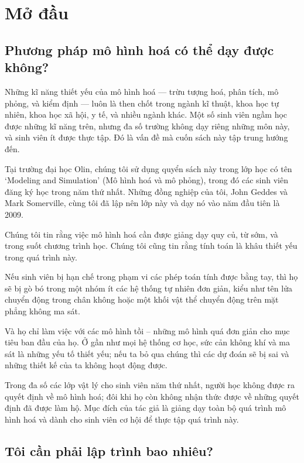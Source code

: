 \documentclass[12pt, openany]{book}
\theoremstyle{exercise}
\begin{document}
\fi

\chapter{Mở đầu}
\label{preface}


\section{Phương pháp mô hình hoá có thể dạy được không?}

Những kĩ năng thiết yếu của mô hình hoá --- trừu tượng hoá, phân tích, mô phỏng, và kiểm định --- luôn là then chốt trong ngành kĩ thuật, khoa học tự nhiên, khoa học xã hội, y tế, và nhiều ngành khác. Một số sinh viên ngầm học được những kĩ năng trên, nhưng đa số trường không dạy riêng những môn này, và sinh viên ít được thực tập. Đó là vấn đề mà cuốn sách này tập trung hướng đến.

Tại trường đại học Olin, chúng tôi sử dụng quyển sách này trong lớp học có tên `Modeling and Simulation' (Mô hình hoá và mô phỏng), trong đó các sinh viên đăng ký học trong năm thứ nhất. Những đồng nghiệp của tôi, John Geddes và Mark Somerville, cùng tôi đã lập nên lớp này và dạy nó vào năm đầu tiên là 2009.

Chúng tôi tin rằng việc mô hình hoá cần được giảng dạy quy củ, từ sớm, và trong suốt chương trình học. Chúng tôi cũng tin rằng tính toán là khâu thiết yếu trong quá trình này. 

Nếu sinh viên bị hạn chế trong phạm vi các phép toán tính được bằng tay, thì họ sẽ bị gò bó trong một nhóm ít các hệ thống tự nhiên đơn giản, kiểu như tên lửa chuyển động trong chân không hoặc một khối vật thể chuyển động trên mặt phẳng không ma sát.

Và họ chỉ làm việc với các mô hình tồi -- những mô hình quá đơn giản cho mục tiêu ban đầu của họ. Ở gần như mọi hệ thống cơ học, sức cản không khí và ma sát là những yếu tố thiết yếu; nếu ta bỏ qua chúng thì các dự đoán sẽ bị sai và những thiết kế của ta không hoạt động được.

Trong đa số các lớp vật lý cho sinh viên năm thứ nhất, người học không được ra quyết định về mô hình hoá; đôi khi họ còn không nhận thức được về những quyết định đã được làm hộ. Mục đích của tác giả là giảng dạy toàn bộ quá trình mô hình hoá và dành cho sinh viên cơ hội để thực tập quá trình này.


\section{Tôi cần phải lập trình bao nhiêu?}
\end{document}
